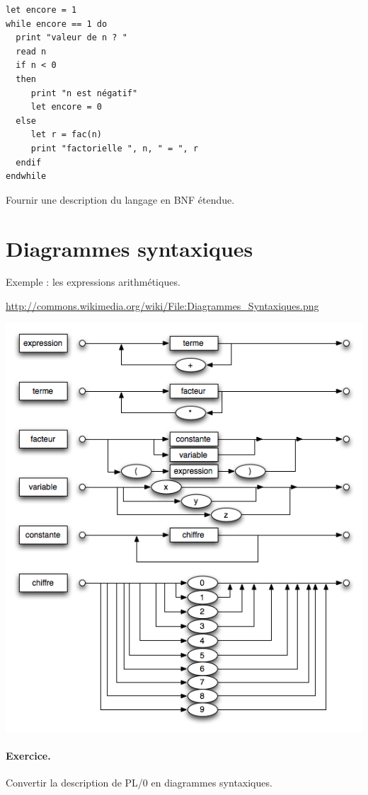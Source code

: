 \documentclass[twoside,11pt]{article}
\begin{document}
{\begin{verbatim}
let encore = 1
while encore == 1 do
  print "valeur de n ? "
  read n
  if n < 0 
  then 
     print "n est négatif"
     let encore = 0
  else 
     let r = fac(n)
     print "factorielle ", n, " = ", r
  endif
endwhile  
\end{verbatim}

Fournir une description du langage en BNF étendue.

\newpage
\section{Diagrammes syntaxiques}
Exemple : les expressions arithmétiques.

{\scriptsize

\url{http://commons.wikimedia.org/wiki/File:Diagrammes_Syntaxiques.png}
}

\begin{center}
\includegraphics[width=\linewidth]{../images/Diagrammes_Syntaxiques}
\end{center}

\paragraph*{Exercice. } Convertir la description de PL/0 en diagrammes syntaxiques.

}
\end{document}
